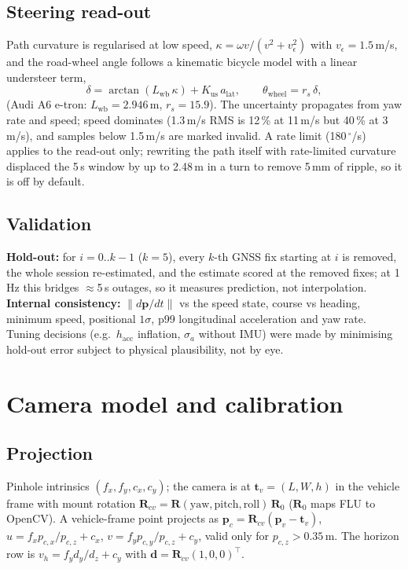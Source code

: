 \documentclass[10pt,a4paper]{article}
\begin{document}
\subsection{Steering read-out}
Path curvature is regularised at low speed, $\kappa = \omega v/(v^2 + v_\epsilon^2)$ with $v_\epsilon = 1.5$\,m/s,
and the road-wheel angle follows a kinematic bicycle model with a linear understeer term,
\begin{equation}
\delta = \arctan(L_\text{wb}\,\kappa) + K_\text{us}\,a_\text{lat},\qquad
\theta_\text{wheel} = r_s\,\delta,
\end{equation}
(Audi A6 e-tron: $L_\text{wb} = 2.946$\,m, $r_s = 15.9$). The uncertainty propagates from yaw rate and speed;
speed dominates (1.3\,m/s RMS is 12\,\% at 11\,m/s but 40\,\% at 3\,m/s), and samples below 1.5\,m/s are
marked invalid. A rate limit (180\,$^\circ$/s) applies to the read-out only; rewriting the path itself with
rate-limited curvature displaced the 5\,s window by up to 2.48\,m in a turn to remove 5\,mm of ripple, so
it is off by default.

\subsection{Validation}
\textbf{Hold-out:} for $i = 0..k-1$ ($k = 5$), every $k$-th GNSS fix starting at $i$ is removed, the whole
session re-estimated, and the estimate scored at the removed fixes; at 1\,Hz this bridges $\approx$5\,s
outages, so it measures prediction, not interpolation. \textbf{Internal consistency:} $\|d\bm p/dt\|$ vs
the speed state, course vs heading, minimum speed, positional $1\sigma$, p99 longitudinal acceleration and
yaw rate. Tuning decisions (e.g.\ $h_\text{acc}$ inflation, $\sigma_a$ without IMU) were made by minimising
hold-out error subject to physical plausibility, not by eye.

\section{Camera model and calibration}
\label{sec:calib}

\subsection{Projection}
Pinhole intrinsics $(f_x, f_y, c_x, c_y)$; the camera is at $\bm t_v = (L, W, h)$ in the vehicle frame with mount
rotation $\mathbf{R}_{cv} = \mathbf{R}(\text{yaw},\text{pitch},\text{roll})\,\mathbf{R}_0$ ($\mathbf{R}_0$ maps FLU to
OpenCV). A vehicle-frame point projects as $\bm p_c = \mathbf{R}_{cv}(\bm p_v - \bm t_v)$,
$u = f_x p_{c,x}/p_{c,z} + c_x$, $v = f_y p_{c,y}/p_{c,z} + c_y$, valid only for $p_{c,z} > 0.35$\,m. The horizon
row is $v_h = f_y d_y/d_z + c_y$ with $\bm d = \mathbf{R}_{cv}(1,0,0)^\top$.
\end{document}
